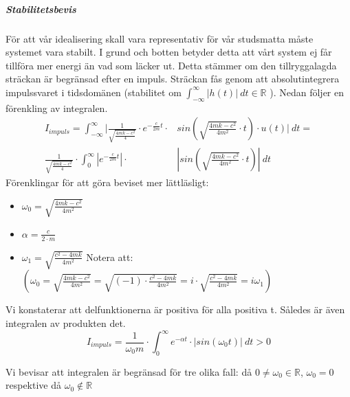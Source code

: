\documentclass[10pt,a4paper]{article}
\begin{document}
\newpage
\subparagraph{Stabilitetsbevis}
För att vår idealisering skall vara representativ för vår studsmatta måste systemet vara stabilt. I grund och botten betyder detta att vårt system ej får tillföra mer energi än vad som läcker ut. Detta stämmer om den tillryggalagda sträckan är begränsad efter en impuls. Sträckan fås genom att absolutintegrera impulssvaret i tidsdomänen (stabilitet om $\int_{-\infty}^{\infty}|h(t)|\ dt\in \mathbb{R}$ ). Nedan följer en förenkling av integralen.
\begin{equation}
\begin{split}
I_{impuls}=\int_{-\infty}^{\infty}| \frac{1}{\sqrt{\frac{4  m  k - c^2}{4}} }  \cdot e^{-\frac{c}{2m}  t} \cdot & sin(\sqrt{\frac{4  m  k - c^2}{4  m^2}} \cdot t) \cdot u(t)| \ dt=\\ \frac{1}{\sqrt{\frac{4  m  k - c^2}{4}} }  \cdot \int_{0}^{\infty}|e^{-\frac{c}{2m}  t}| \cdot & |sin(\sqrt{\frac{4  m  k - c^2}{4  m^2}} \cdot t)| \ dt
\end{split}
\end{equation}
Förenklingar för att göra beviset mer lättläsligt:
\begin{itemize}
\item $\omega_0=\sqrt{\frac{4  m  k - c^2}{4  m^2}}$
\item $\alpha=\frac{c}{2\cdot m}$
\item $\omega_1=\sqrt{\frac{c^2-4  m  k}{4  m^2}}$
\newline
\newline 
Notera att: $\left( \omega_0=\sqrt{\frac{4  m  k-c^2}{4  m^2}}=\sqrt{(-1)\cdot\frac{c^2-4  m  k}{4  m^2}}=i\cdot\sqrt{\frac{c^2-4  m  k}{4  m^2}}=i \omega_1\right)$
\end{itemize}

Vi konstaterar att delfunktionerna är positiva för alla positiva t. Således är även integralen av produkten det.
$$I_{impuls}=\frac{1}{\omega_0  m} \cdot \int_{0}^{\infty}e^{-\alpha t}\cdot | sin(\omega_0 t)| \ dt>0$$

Vi bevisar att integralen är begränsad för tre olika fall: då $0\neq\omega_0 \in \mathbb{R}$, $\omega_0=0$ respektive då $\omega_0 \notin \mathbb{R}$
\end{document}
